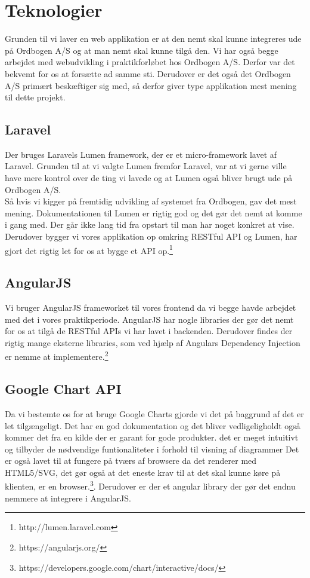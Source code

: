 \hypertarget{Teknologier}{}
\section{Teknologier}
Grunden til vi laver en web applikation er at den nemt skal kunne integreres ude på Ordbogen A/S  og at man nemt skal kunne tilgå den.
Vi har også begge arbejdet med webudvikling i praktikforløbet hos Ordbogen A/S. Derfor var det bekvemt for os at forsætte ad samme sti.
Derudover er det også det Ordbogen A/S primært beskæftiger sig med, så derfor giver type applikation mest mening til dette projekt.
\hypertarget{Laravel}{}
\subsection{Laravel}
\label{Laravel}
Der bruges Laravels Lumen framework, der er et micro-framework lavet af Laravel. Grunden til at vi valgte Lumen
fremfor Laravel, var at vi gerne ville have mere kontrol over de ting vi lavede og at Lumen også bliver brugt ude på Ordbogen A/S.
\\
Så hvis vi kigger på fremtidig udvikling af systemet fra Ordbogen, gav det mest mening.
Dokumentationen til Lumen er rigtig god og det gør det nemt at komme i gang med. Der går ikke lang tid fra opstart
til man har noget konkret at vise. 
Derudover bygger vi vores applikation op omkring RESTful API og Lumen, har gjort det rigtig let for os at bygge 
et API op.\footnote{http://lumen.laravel.com}
\hypertarget{AngularJS}{}
\subsection{AngularJS}
Vi bruger AngularJS frameworket til vores frontend da vi begge havde arbejdet med det
i vores praktikperiode. AngularJS har nogle libraries der gør det nemt for os at tilgå de RESTful APIs
vi har lavet i backenden. 
Derudover findes der rigtig mange eksterne libraries, som ved hjælp af Angulars Dependency Injection er nemme at implementere.\footnote{https://angularjs.org/}
\hypertarget{GoogleChartAPI}{}
\subsection{Google Chart API}
Da vi bestemte os for at bruge Google Charts gjorde vi det på baggrund af det er let tilgængeligt.
Det har en god dokumentation og det bliver vedligeligholdt også kommer det fra en kilde der er garant for gode produkter.
det er meget intuitivt og tilbyder de nødvendige funtionaliteter i forhold til visning af diagrammer 
Det er også lavet til at fungere på tværs af browsere da det renderer med HTML5/SVG, 
det gør også at det eneste krav til at det skal kunne køre på klienten, er en browser.\footnote{https://developers.google.com/chart/interactive/docs/}. 
Derudover er der et angular library der gør det endnu nemmere at integrere i AngularJS.
